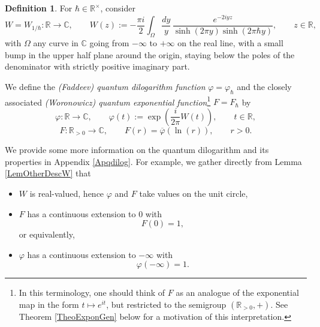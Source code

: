 \documentclass[11pt, reqno]{amsart}
\theoremstyle{definition}
\newtheorem{defn}[theorem]{Definition}
\numberwithin{equation}{section}
\def\C{\mathbb C}
\def\R{\mathbb R}
\begin{document}
\begin{defn}
For $\hbar\in \R^{\times}$, consider 
\begin{equation}\label{EqFunctWTheta}
W = W_{1/\hbar}\colon \R\rightarrow \C,\qquad W(z) := -\frac{\pi i}{2} \int_{\Omega} \frac{dy}{y}\, \frac{e^{-2 iyz}}{\sinh(2\pi y)\sinh(2\pi \hbar y)},\qquad z \in \R,
\end{equation}
with $\Omega$ any curve in $\C$ going from $-\infty$ to $+\infty$ on the real line, with a small bump in the upper half plane around the origin, staying below the poles of the denominator with strictly positive imaginary part.

We define the \emph{(Faddeev) quantum dilogarithm function} $\varphi = \varphi_{\hbar}$ and the closely associated \emph{(Woronowicz) quantum exponential function}\footnote{In this terminology, one should think of $F$ as an analogue of the exponential map in the form $t \mapsto e^{it}$, but restricted to the semigroup $(\R_{>0},+)$. See Theorem \ref{TheoExponGen} below for a motivation of this interpretation.} $F = F_{\hbar}$  by
\begin{equation}\label{EqQuantExp}
\varphi\colon \R\rightarrow \C,\qquad \varphi(t) := \exp\left(\frac{i}{2\pi}W(t)\right),\qquad t\in \R,
\end{equation}
\begin{equation}\label{EqQuantExp2}
F\colon \R_{>0} \rightarrow \C,\qquad F(r) = \overline{\varphi}(\ln(r)),\qquad r>0.
\end{equation}
\end{defn}

We provide some more information on the quantum dilogarithm and its properties in Appendix \ref{Apqdilog}. For example, we gather directly from Lemma \ref{LemOtherDescW} that
\begin{itemize}
\item  $W$ is real-valued, hence $\varphi$ and $F$ take values on the unit circle, 
\item $F$ has a continuous extension to $0$ with 
\begin{equation}\label{EqValueF0}
F(0)=1,
\end{equation}
or equivalently,
\item $\varphi$ has a continuous extension to $-\infty$ with 
\begin{equation}
\varphi(-\infty)= 1.
\end{equation}
\end{itemize}
\end{document}
